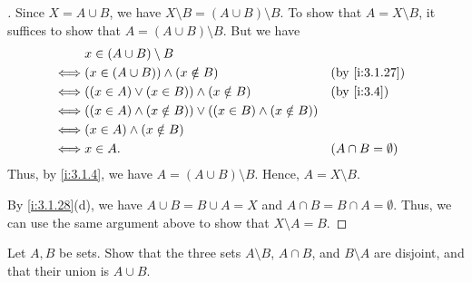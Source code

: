 \begin{proof}[]
  Since \(X = A \cup B\), we have \(X \setminus B = (A \cup B) \setminus B\).
  To show that \(A = X \setminus B\), it suffices to show that \(A = (A \cup B) \setminus B\).
  But we have
  \begin{align*}
         & x \in (A \cup B) \setminus B                                                                   \\
    \iff & (x \in (A \cup B)) \land (x \notin B)                              &  & \by{i:3.1.27}          \\
    \iff & ((x \in A) \lor (x \in B)) \land (x \notin B)                      &  & \by{i:3.4}             \\
    \iff & ((x \in A) \land (x \notin B)) \lor ((x \in B) \land (x \notin B))                             \\
    \iff & (x \in A) \land (x \notin B)                                                                   \\
    \iff & x \in A.                                                           &  & (A \cap B = \emptyset)
  \end{align*}
  Thus, by \cref{i:3.1.4}, we have \(A = (A \cup B) \setminus B\).
  Hence, \(A = X \setminus B\).

  By \cref{i:3.1.28}(d), we have \(A \cup B = B \cup A = X\) and \(A \cap B = B \cap A = \emptyset\).
  Thus, we can use the same argument above to show that \(X \setminus A = B\).
\end{proof}

\begin{ex}\label{i:ex:3.1.10}
  Let \(A, B\) be sets.
  Show that the three sets \(A \setminus B\), \(A \cap B\), and \(B \setminus A\) are disjoint, and that their union is \(A \cup B\).
\end{ex}

